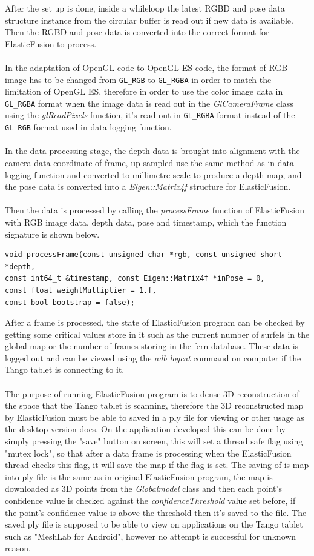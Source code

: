 \documentclass[12pt,twoside]{article}
\begin{document}
After the set up is done, inside a whileloop the latest RGBD and pose data structure instance from the circular buffer is read out if new data is available. Then the RGBD and pose data is converted into the correct format for ElasticFusion to process.\\
\\
In the adaptation of OpenGL code to OpenGL ES code, the format of RGB image has to be changed from \verb|GL_RGB| to \verb|GL_RGBA| in order to match the limitation of OpenGL ES, therefore in order to use the color image data in \verb|GL_RGBA| format when the image data is read out in the \textit{GlCameraFrame} class using the \textit{glReadPixels} function, it's read out in \verb|GL_RGBA| format instead of the \verb|GL_RGB| format used in data logging function.\\
\\
In the data processing stage, the depth data is brought into alignment with the camera data coordinate of frame,  up-sampled use the same method as in data logging function and converted to millimetre scale to produce a depth map, and the pose data is converted into a \textit{Eigen::Matrix4f} structure for ElasticFusion.\\
\\
Then the data is processed by calling the \textit{processFrame} function of ElasticFusion with RGB image data, depth data, pose and timestamp, which the function signature is shown below.
\\
\begin{lstlisting}
void processFrame(const unsigned char *rgb, const unsigned short *depth,
const int64_t &timestamp, const Eigen::Matrix4f *inPose = 0,
const float weightMultiplier = 1.f,
const bool bootstrap = false);
\end{lstlisting}
After a frame is processed, the state of ElasticFusion program can be checked by getting some critical values store in it such as the current number of surfels in the global map or the number of frames storing in the fern database. These data is logged out and can be viewed using the \textit{adb logcat} command on computer if the Tango tablet is
connecting to it.\\
\\
The purpose of running ElasticFusion program is to dense 3D reconstruction of the space that the Tango tablet is scanning, therefore the 3D reconstructed map by ElasticFusion must be able to saved in a ply file for viewing or other usage as the desktop version does. On the application developed this can be done by simply pressing the "save" button on screen, this will set a thread safe flag using "mutex lock", so that after a data frame is processing when the ElasticFusion thread checks this flag, it will save the map if the flag is set. The saving of is map into ply file is the same as in original ElasticFusion program, the map is downloaded as 3D points from the \textit{Globalmodel} class and then each point's confidence value is checked against the \textit{confidenceThreshold} value set before, if the point's confidence value is above the threshold then it's saved to the file. The saved ply file is supposed to be able to view on applications on the Tango tablet such as "MeshLab for Android", however no attempt is successful for unknown reason.\\
\end{document}
